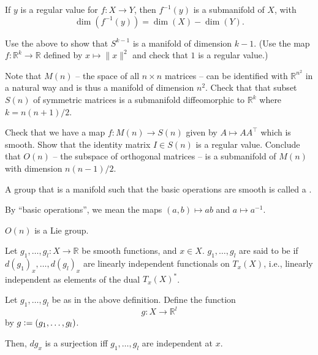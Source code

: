 \begin{thm}
	If $y$ is a regular value for $f : X \to Y$, then $f^{-1}(y)$ is a submanifold of $X$, with
	\begin{equation*} 
		\boxed{\dim(f^{-1}(y)) = \dim(X) - \dim(Y).}
	\end{equation*}
\end{thm}

\begin{exe}
	Use the above to show that $S^{k - 1}$ is a manifold of dimension $k - 1$. (Use the map $f : \mathbb{R}^{k} \to \mathbb{R}$ defined by $x \mapsto \|x\|^{2}$ and check that $1$ is a regular value.)
\end{exe}

\begin{exe}
	Note that $M(n)$ -- the space of all $n \times n$ matrices -- can be identified with $\mathbb{R}^{n^{2}}$ in a natural way and is thus a manifold of dimension $n^{2}$. Check that that subset $S(n)$ of symmetric matrices is a submanifold diffeomorphic to $\mathbb{R}^{k}$ where $k = n(n + 1)/2$.

	Check that we have a map $f : M(n) \to S(n)$ given by $A \mapsto AA^{\top}$ which is smooth. Show that the identity matrix $I \in S(n)$ is a regular value. Conclude that $O(n)$ -- the subspace of orthogonal matrices -- is a submanifold of $M(n)$ with dimension $n(n - 1)/2$.
\end{exe}

\begin{defn}
	A group that is a manifold such that the basic operations are smooth is called a .
\end{defn}
By ``basic operations'', we mean the maps $(a, b) \mapsto ab$ and $a \mapsto a^{-1}$.

\begin{ex}
	$O(n)$ is a Lie group.
\end{ex}

\begin{defn}
	Let $g_{1}, \ldots, g_{l} : X \to \mathbb{R}$ be smooth functions, and $x \in X$. \newline
	$g_{1}, \ldots, g_{l}$ are said to be  if $d(g_{1})_{x}, \ldots, d(g_{l})_{x}$ are linearly independent functionals on $T_{x}(X)$, i.e., linearly independent as elements of the dual $T_{x}(X)^{\ast}$.
\end{defn}

\begin{prop}
	Let $g_{1}, \ldots, g_{l}$ be as in the above definition. Define the function
	\begin{equation*} 
		g : X \to \mathbb{R}^{l}
	\end{equation*}
	by $g \vcentcolon= (g_{1}, \ldots, g_{l})$.

	Then, $dg_{x}$ is a surjection iff $g_{1}, \ldots, g_{l}$ are independent at $x$.
\end{prop}

